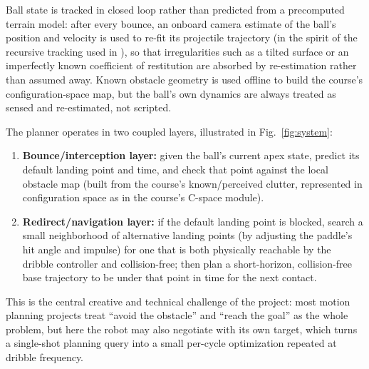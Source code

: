 \documentclass[10pt,twocolumn]{article}
\begin{document}
Ball state is tracked in closed loop rather than predicted from a
precomputed terrain model: after every bounce, an onboard camera estimate
of the ball's position and velocity is used to re-fit its projectile
trajectory (in the spirit of the recursive tracking used in
\cite{batz2009icra}), so that irregularities such as a tilted surface or an
imperfectly known coefficient of restitution are absorbed by
re-estimation rather than assumed away. Known obstacle geometry is used
offline to build the course's configuration-space map, but the ball's own
dynamics are always treated as sensed and re-estimated, not scripted.

The planner operates in two coupled layers, illustrated in Fig.~\ref{fig:system}:
\begin{enumerate}[nosep]
  \item \textbf{Bounce/interception layer:} given the ball's current apex
  state, predict its default landing point and time, and check that point
  against the local obstacle map (built from the course's known/perceived
  clutter, represented in configuration space as in the course's C-space
  module).
  \item \textbf{Redirect/navigation layer:} if the default landing point is
  blocked, search a small neighborhood of alternative landing points (by
  adjusting the paddle's hit angle and impulse) for one that is both
  physically reachable by the dribble controller and collision-free; then
  plan a short-horizon, collision-free base trajectory to be under that
  point in time for the next contact.
\end{enumerate}
This is the central creative and technical challenge of the project: most
motion planning projects treat ``avoid the obstacle'' and ``reach the goal''
as the whole problem, but here the robot may also negotiate with its own
target, which turns a single-shot planning query into a small per-cycle
optimization repeated at dribble frequency.
\end{document}
